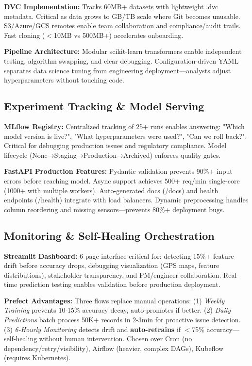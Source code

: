 \documentclass[11pt,a4paper]{article}
\begin{document}
\textbf{DVC Implementation:} Tracks 60MB+ datasets with lightweight .dvc metadata. Critical as data grows to GB/TB scale where Git becomes unusable. S3/Azure/GCS remotes enable team collaboration and compliance/audit trails. Fast cloning ($<$10MB vs 500MB+) accelerates onboarding.

\textbf{Pipeline Architecture:} Modular scikit-learn transformers enable independent testing, algorithm swapping, and clear debugging. Configuration-driven YAML separates data science tuning from engineering deployment—analysts adjust hyperparameters without touching code.

\subsection{Experiment Tracking \& Model Serving}

\textbf{MLflow Registry:} Centralized tracking of 25+ runs enables answering: "Which model version is live?", "What hyperparameters were used?", "Can we roll back?". Critical for debugging production issues and regulatory compliance. Model lifecycle (None→Staging→Production→Archived) enforces quality gates.

\textbf{FastAPI Production Features:} Pydantic validation prevents 90\%+ input errors before reaching model. Async support achieves 500+ req/min single-core (1000+ with multiple workers). Auto-generated docs (/docs) and health endpoints (/health) integrate with load balancers. Dynamic preprocessing handles column reordering and missing sensors—prevents 80\%+ deployment bugs.

\subsection{Monitoring \& Self-Healing Orchestration}

\textbf{Streamlit Dashboard:} 6-page interface critical for: detecting 15\%+ feature drift before accuracy drops, debugging visualization (GPS maps, feature distributions), stakeholder transparency, and PM/engineer collaboration. Real-time prediction testing enables validation before production deployment.

\textbf{Prefect Advantages:} Three flows replace manual operations: (1) \textit{Weekly Training} prevents 10-15\% accuracy decay, auto-promotes if better. (2) \textit{Daily Predictions} batch process 50K+ records in 2-3min for proactive issue detection. (3) \textit{6-Hourly Monitoring} detects drift and \textbf{auto-retrains} if $<$75\% accuracy—self-healing without human intervention. Chosen over Cron (no dependency/retry/visibility), Airflow (heavier, complex DAGs), Kubeflow (requires Kubernetes).
\end{document}
